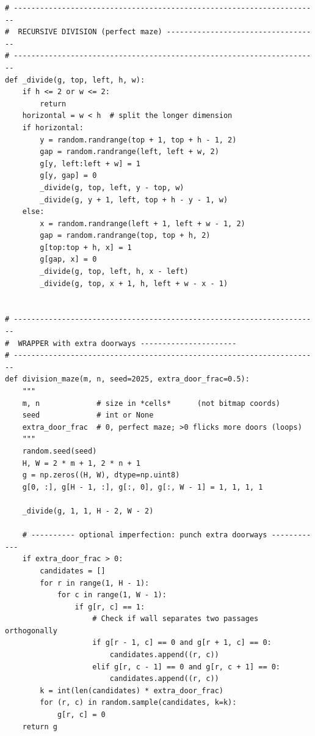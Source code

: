 \begin{center}
\begin{lstlisting}[caption={Code for the maze Construction}, label={lst:example}]
# ----------------------------------------------------------------------
#  RECURSIVE DIVISION (perfect maze) -----------------------------------
# ----------------------------------------------------------------------
def _divide(g, top, left, h, w):
    if h <= 2 or w <= 2:
        return
    horizontal = w < h  # split the longer dimension
    if horizontal:
        y = random.randrange(top + 1, top + h - 1, 2)      
        gap = random.randrange(left, left + w, 2)          
        g[y, left:left + w] = 1
        g[y, gap] = 0                                      
        _divide(g, top, left, y - top, w)     
        _divide(g, y + 1, left, top + h - y - 1, w)    
    else:
        x = random.randrange(left + 1, left + w - 1, 2)   
        gap = random.randrange(top, top + h, 2)
        g[top:top + h, x] = 1
        g[gap, x] = 0
        _divide(g, top, left, h, x - left) 
        _divide(g, top, x + 1, h, left + w - x - 1)


# ----------------------------------------------------------------------
#  WRAPPER with extra doorways ----------------------
# ----------------------------------------------------------------------
def division_maze(m, n, seed=2025, extra_door_frac=0.5):
    """
    m, n             # size in *cells*      (not bitmap coords)
    seed             # int or None
    extra_door_frac  # 0, perfect maze; >0 flicks more doors (loops)
    """
    random.seed(seed)
    H, W = 2 * m + 1, 2 * n + 1
    g = np.zeros((H, W), dtype=np.uint8)
    g[0, :], g[H - 1, :], g[:, 0], g[:, W - 1] = 1, 1, 1, 1

    _divide(g, 1, 1, H - 2, W - 2)

    # ---------- optional imperfection: punch extra doorways ------------
    if extra_door_frac > 0:
        candidates = []
        for r in range(1, H - 1):
            for c in range(1, W - 1):
                if g[r, c] == 1:
                    # Check if wall separates two passages orthogonally
                    if g[r - 1, c] == 0 and g[r + 1, c] == 0:
                        candidates.append((r, c))
                    elif g[r, c - 1] == 0 and g[r, c + 1] == 0:
                        candidates.append((r, c))
        k = int(len(candidates) * extra_door_frac)
        for (r, c) in random.sample(candidates, k=k):
            g[r, c] = 0
    return g
\end{lstlisting}
\end{center}




